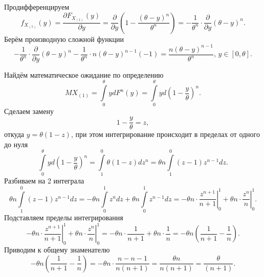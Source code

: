 \begin{enumerate}[label=\alph*)]
Продифференцируем
$$f_{X_{ \left( 1 \right) }} \left( y \right) =
  \frac{ \partial F_{X_{ \left( 1 \right) }} \left( y \right) }{ \partial y} =
  \frac{ \partial }{ \partial y}
    \left( 1 - \frac{ \left( \theta - y \right)^n}{ \theta^n} \right) =
  - \frac{1}{ \theta^n} \cdot \frac{ \partial }{ \partial y} \left( \theta - y \right)^n.$$
Берём производную сложной функции
$$- \frac{1}{ \theta^n} \cdot \frac{ \partial }{ \partial y} \left( \theta - y \right)^n
  - \frac{1}{ \theta^n} \cdot n \left( \theta - y \right)^{n - 1} \left( -1 \right) =
  \frac{n \left( \theta - y \right)^{n - 1}}{ \theta^n}, \,
  y \in \left[ 0, \theta \right].$$

Найдём математическое ожидание по определению
$$MX_{ \left( 1 \right) } =
  \int \limits_0^{ \theta } ydF^n \left( y \right) =
  \int \limits_0^{ \theta } yd \left( 1 - \frac{y}{ \theta } \right)^n.$$
Сделаем замену
$$1 - \frac{y}{ \theta } =
  z,$$
откуда $y = \theta \left( 1 - z \right) $,
при этом интегрирование происходит в пределах от одного до нуля
$$ \int \limits_0^{ \theta } yd \left( 1 - \frac{y}{ \theta } \right)^n =
  \int \limits_1^0 \theta \left( 1 - z \right) dz^n =
  \theta n \int \limits_1^0 \left( z - 1 \right) z^{n - 1} dz.$$
Разбиваем на 2 интеграла
$$ \theta n \int \limits_1^0 \left( z - 1 \right) z^{n - 1} dz =
  - \theta n \int \limits_0^1 z^n dz + \theta n \int \limits_0^1 z^{n - 1} dz =
  - \theta n \cdot \left. \frac{z^{n + 1}}{n + 1} \right|_0^1 +
  \theta n \cdot \left. \frac{z^n}{n} \right|_0^1.$$
Подставляем пределы интегрирования
$$- \theta n \cdot \left. \frac{z^{n + 1}}{n + 1} \right|_0^1 +
  \theta n \cdot \left. \frac{z^n}{n} \right|_0^1 =
  - \theta n \cdot \frac{1}{n + 1} + \theta n \cdot \frac{1}{n} =
  - \theta n \left( \frac{1}{n + 1} - \frac{1}{n} \right).$$
Приводим к общему знаменателю
$$ - \theta n \left( \frac{1}{n + 1} - \frac{1}{n} \right) =
  - \theta n \cdot \frac{n - n - 1}{n \left( n + 1 \right) } =
  \frac{ \theta n}{n \left( n + 1 \right) } =
  \frac{ \theta }{ \left( n + 1 \right) }.$$


\end{enumerate}
